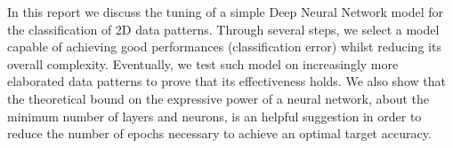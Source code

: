 In this report we discuss the tuning of a simple Deep Neural Network model for the classification of 2D data patterns. Through several steps, we select a model capable of achieving good performances (classification error) whilst reducing its overall complexity. Eventually, we test such model on increasingly more elaborated data patterns to prove that its effectiveness holds. We also show that the theoretical bound on the expressive power of a neural network, about the minimum number of layers and neurons, is an helpful suggestion in order to reduce the number of epochs necessary to achieve an optimal target accuracy.
